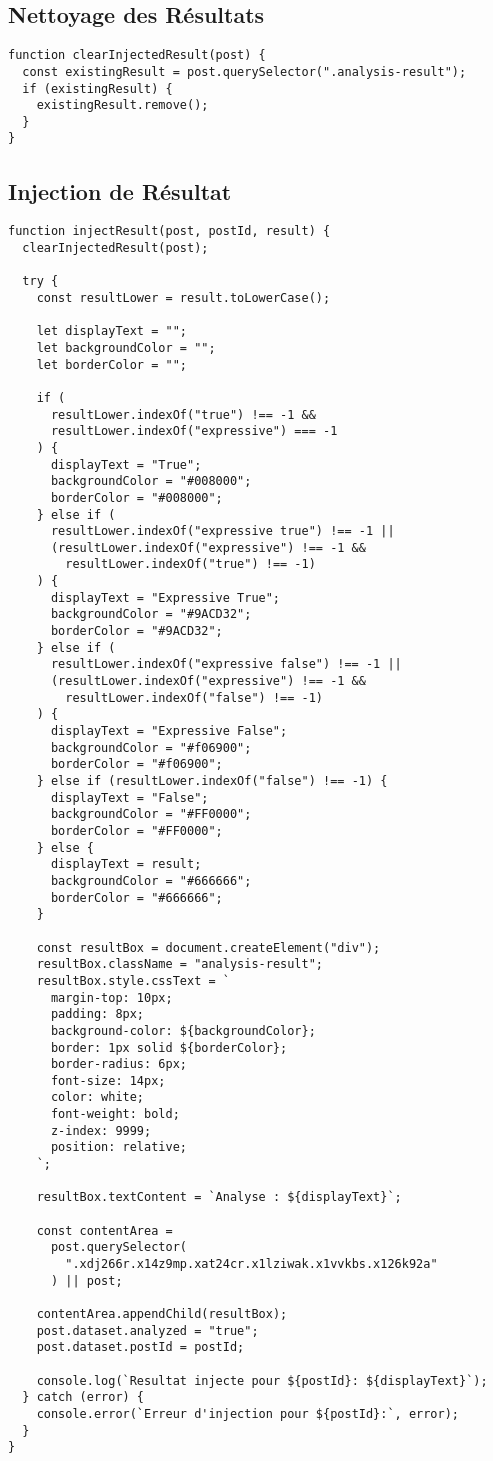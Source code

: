 \documentclass[12pt,a4paper]{article}
\begin{document}
\subsection{Nettoyage des Résultats}

\begin{lstlisting}
function clearInjectedResult(post) {
  const existingResult = post.querySelector(".analysis-result");
  if (existingResult) {
    existingResult.remove();
  }
}
\end{lstlisting}

\subsection{Injection de Résultat}

\begin{lstlisting}
function injectResult(post, postId, result) {
  clearInjectedResult(post);

  try {
    const resultLower = result.toLowerCase();

    let displayText = "";
    let backgroundColor = "";
    let borderColor = "";

    if (
      resultLower.indexOf("true") !== -1 &&
      resultLower.indexOf("expressive") === -1
    ) {
      displayText = "True";
      backgroundColor = "#008000";
      borderColor = "#008000";
    } else if (
      resultLower.indexOf("expressive true") !== -1 ||
      (resultLower.indexOf("expressive") !== -1 &&
        resultLower.indexOf("true") !== -1)
    ) {
      displayText = "Expressive True";
      backgroundColor = "#9ACD32";
      borderColor = "#9ACD32";
    } else if (
      resultLower.indexOf("expressive false") !== -1 ||
      (resultLower.indexOf("expressive") !== -1 &&
        resultLower.indexOf("false") !== -1)
    ) {
      displayText = "Expressive False";
      backgroundColor = "#f06900";
      borderColor = "#f06900";
    } else if (resultLower.indexOf("false") !== -1) {
      displayText = "False";
      backgroundColor = "#FF0000";
      borderColor = "#FF0000";
    } else {
      displayText = result;
      backgroundColor = "#666666";
      borderColor = "#666666";
    }

    const resultBox = document.createElement("div");
    resultBox.className = "analysis-result";
    resultBox.style.cssText = `
      margin-top: 10px;
      padding: 8px;
      background-color: ${backgroundColor};
      border: 1px solid ${borderColor};
      border-radius: 6px;
      font-size: 14px;
      color: white;
      font-weight: bold;
      z-index: 9999;
      position: relative;
    `;

    resultBox.textContent = `Analyse : ${displayText}`;

    const contentArea =
      post.querySelector(
        ".xdj266r.x14z9mp.xat24cr.x1lziwak.x1vvkbs.x126k92a"
      ) || post;

    contentArea.appendChild(resultBox);
    post.dataset.analyzed = "true";
    post.dataset.postId = postId;

    console.log(`Resultat injecte pour ${postId}: ${displayText}`);
  } catch (error) {
    console.error(`Erreur d'injection pour ${postId}:`, error);
  }
}
\end{lstlisting}
\end{document}
